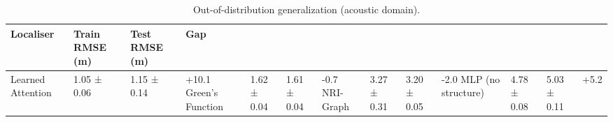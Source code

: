 \begin{table}
\caption{Out-of-distribution generalization (acoustic domain).}
\label{tab:ood-acoustic}
\begin{tabular}{llll}
\toprule
Localiser & Train RMSE (m) & Test RMSE (m) & Gap \\
\midrule
Learned Attention & 1.05 ± 0.06 & 1.15 ± 0.14 & +10.1%
Green's Function & 1.62 ± 0.04 & 1.61 ± 0.04 & -0.7%
NRI-Graph & 3.27 ± 0.31 & 3.20 ± 0.05 & -2.0%
MLP (no structure) & 4.78 ± 0.08 & 5.03 ± 0.11 & +5.2%
\bottomrule
\end{tabular}
\end{table}
